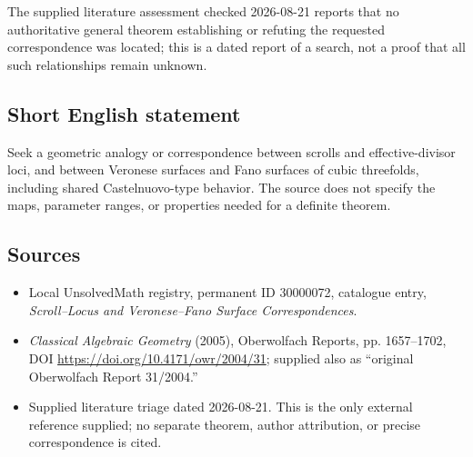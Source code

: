 \documentclass[11pt]{article}
\begin{document}
The supplied literature assessment checked 2026-08-21 reports that no authoritative general theorem establishing or refuting the requested correspondence was located; this is a dated report of a search, not a proof that all such relationships remain unknown.
\subsection{Short English statement}
Seek a geometric analogy or correspondence between scrolls and effective-divisor loci, and between Veronese surfaces and Fano surfaces of cubic threefolds, including shared Castelnuovo-type behavior. The source does not specify the maps, parameter ranges, or properties needed for a definite theorem.
\subsection{Sources}
\begin{itemize}
\item Local UnsolvedMath registry, permanent ID 30000072, catalogue entry, \emph{Scroll--Locus and Veronese--Fano Surface Correspondences}.
\item \emph{Classical Algebraic Geometry} (2005), Oberwolfach Reports, pp. 1657--1702, DOI \url{https://doi.org/10.4171/owr/2004/31}; supplied also as ``original Oberwolfach Report 31/2004.''
\item Supplied literature triage dated 2026-08-21. This is the only external reference supplied; no separate theorem, author attribution, or precise correspondence is cited.
\end{itemize}
\end{document}

